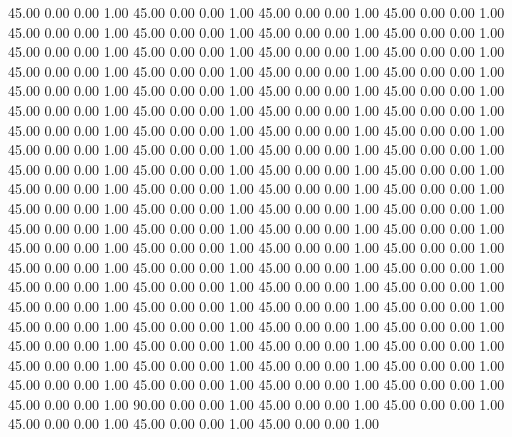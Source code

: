    45.00   0.00   0.00   1.00
   45.00   0.00   0.00   1.00
   45.00   0.00   0.00   1.00
   45.00   0.00   0.00   1.00
   45.00   0.00   0.00   1.00
   45.00   0.00   0.00   1.00
   45.00   0.00   0.00   1.00
   45.00   0.00   0.00   1.00
   45.00   0.00   0.00   1.00
   45.00   0.00   0.00   1.00
   45.00   0.00   0.00   1.00
   45.00   0.00   0.00   1.00
   45.00   0.00   0.00   1.00
   45.00   0.00   0.00   1.00
   45.00   0.00   0.00   1.00
   45.00   0.00   0.00   1.00
   45.00   0.00   0.00   1.00
   45.00   0.00   0.00   1.00
   45.00   0.00   0.00   1.00
   45.00   0.00   0.00   1.00
   45.00   0.00   0.00   1.00
   45.00   0.00   0.00   1.00
   45.00   0.00   0.00   1.00
   45.00   0.00   0.00   1.00
   45.00   0.00   0.00   1.00
   45.00   0.00   0.00   1.00
   45.00   0.00   0.00   1.00
   45.00   0.00   0.00   1.00
   45.00   0.00   0.00   1.00
   45.00   0.00   0.00   1.00
   45.00   0.00   0.00   1.00
   45.00   0.00   0.00   1.00
   45.00   0.00   0.00   1.00
   45.00   0.00   0.00   1.00
   45.00   0.00   0.00   1.00
   45.00   0.00   0.00   1.00
   45.00   0.00   0.00   1.00
   45.00   0.00   0.00   1.00
   45.00   0.00   0.00   1.00
   45.00   0.00   0.00   1.00
   45.00   0.00   0.00   1.00
   45.00   0.00   0.00   1.00
   45.00   0.00   0.00   1.00
   45.00   0.00   0.00   1.00
   45.00   0.00   0.00   1.00
   45.00   0.00   0.00   1.00
   45.00   0.00   0.00   1.00
   45.00   0.00   0.00   1.00
   45.00   0.00   0.00   1.00
   45.00   0.00   0.00   1.00
   45.00   0.00   0.00   1.00
   45.00   0.00   0.00   1.00
   45.00   0.00   0.00   1.00
   45.00   0.00   0.00   1.00
   45.00   0.00   0.00   1.00
   45.00   0.00   0.00   1.00
   45.00   0.00   0.00   1.00
   45.00   0.00   0.00   1.00
   45.00   0.00   0.00   1.00
   45.00   0.00   0.00   1.00
   45.00   0.00   0.00   1.00
   45.00   0.00   0.00   1.00
   45.00   0.00   0.00   1.00
   45.00   0.00   0.00   1.00
   45.00   0.00   0.00   1.00
   45.00   0.00   0.00   1.00
   45.00   0.00   0.00   1.00
   45.00   0.00   0.00   1.00
   45.00   0.00   0.00   1.00
   45.00   0.00   0.00   1.00
   45.00   0.00   0.00   1.00
   45.00   0.00   0.00   1.00
   45.00   0.00   0.00   1.00
   45.00   0.00   0.00   1.00
   45.00   0.00   0.00   1.00
   45.00   0.00   0.00   1.00
   45.00   0.00   0.00   1.00
   45.00   0.00   0.00   1.00
   45.00   0.00   0.00   1.00
   45.00   0.00   0.00   1.00
   45.00   0.00   0.00   1.00
   90.00   0.00   0.00   1.00
   45.00   0.00   0.00   1.00
   45.00   0.00   0.00   1.00
   45.00   0.00   0.00   1.00
   45.00   0.00   0.00   1.00
   45.00   0.00   0.00   1.00
